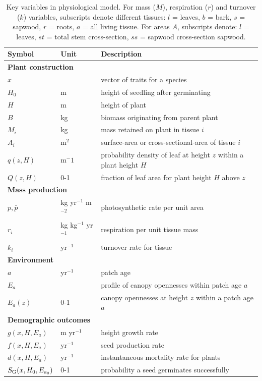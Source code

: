 \documentclass[10pt,twoside]{article}
\begin{document}
\begin{table}[h!]
 \caption{Key variables in physiological model. For mass ($M$), respiration ($r$) and turnover ($k$)
 variables, subscripts denote different tissues: \(l\) = leaves, \(b\) = bark, \(s\) = sapwood,
 \(r\) = roots, \(a\) = all living tissue. For areas \(A\), subscripts denote: \(l\) = leaves, \(st\) = total stem cross-section, \(ss\) = sapwood cross-section sapwood.}
\centering
  \begin{tabular}{p{2cm}p{2.5cm}p{8cm}}
  \hline
  Symbol & Unit & Description \\
  \hline
  \multicolumn{3}{l}{\textbf{Plant construction}} \\
  $x$   & & vector of traits for a species\\
  $H_0$   & m  & height of seedling after germinating\\
  $H$   & m  & height of plant\\
  $B$   & kg  & biomass originating from parent plant\\
  $M_i$ & kg  & mass retained on plant in tissue $i$\\
  $A_i$ & m$^2$  & surface-area or cross-sectional-area of tissue $i$\\
  $q(z, H)$ & m$^-1$ & probability density of leaf at height $z$ within a plant height $H$\\
  $Q(z, H)$ & 0-1 & fraction of leaf area for plant height $H$ above $z$\\
  \multicolumn{3}{l}{\textbf{Mass production}} \\
  $p,\bar{p}$ & kg yr$^{-1}$ m$^{-2}$  & photosynthetic rate per unit area \\
  $r_i$ & kg kg$^{-1}$ yr$^{-1}$ & respiration per unit tissue mass \\
  $k_i$ & yr$^{-1}$ & turnover rate for tissue \\
  \multicolumn{3}{l}{\textbf{Environment}} \\
  $a$ & yr$^{-1}$ & patch age\\
  $E_a$ & & profile of canopy opennesses within patch age $a$\\
  $E_a(z)$& 0-1 & canopy opennesses at height $z$ within a patch age $a$\\
  \multicolumn{3}{l}{\textbf{Demographic outcomes}} \\
  $g(x, H, E_a)$ & m yr$^{-1}$ & height growth rate \\
  $f(x, H, E_a)$ & yr$^{-1}$ & seed production rate \\
  $d(x, H, E_a)$ & yr$^{-1}$ & instantaneous mortality rate for plants\\
  $S_{\rm G} (x, H_0, E_{a_0})$ & 0-1 & probability a seed germinates successfully \\
  \hline
  \end{tabular}
\label{tab:definitions}
\end{table}
\end{document}
